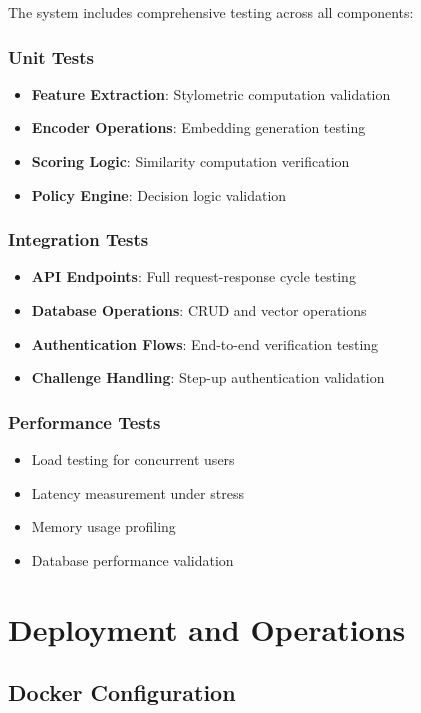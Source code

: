 \documentclass[12pt,a4paper]{article}
\begin{document}
The system includes comprehensive testing across all components:

\subsubsection{Unit Tests}
\begin{itemize}
    \item \textbf{Feature Extraction}: Stylometric computation validation
    \item \textbf{Encoder Operations}: Embedding generation testing
    \item \textbf{Scoring Logic}: Similarity computation verification
    \item \textbf{Policy Engine}: Decision logic validation
\end{itemize}

\subsubsection{Integration Tests}
\begin{itemize}
    \item \textbf{API Endpoints}: Full request-response cycle testing
    \item \textbf{Database Operations}: CRUD and vector operations
    \item \textbf{Authentication Flows}: End-to-end verification testing
    \item \textbf{Challenge Handling}: Step-up authentication validation
\end{itemize}

\subsubsection{Performance Tests}
\begin{itemize}
    \item Load testing for concurrent users
    \item Latency measurement under stress
    \item Memory usage profiling
    \item Database performance validation
\end{itemize}

\section{Deployment and Operations}

\subsection{Docker Configuration}
\end{document}
